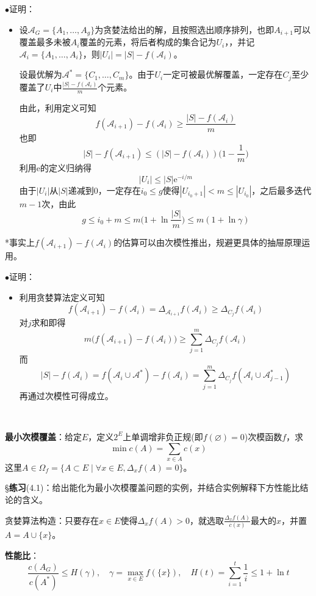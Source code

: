 \documentclass[a4paper,UTF8,fontset=windows]{ctexart}
\newcommand{\exce}[2]{\S\textbf{练习}(#1)：{\kaishu #2}}
\newcommand{\proo}[1]{{\kaishu $\bullet$证明：
\begin{itemize}
    \item[] #1
\end{itemize}
}}
\newcommand{\er}{\mathrm{e}}
\begin{document}
\proo{
    设$\mathcal{A}_G=\{A_1,\dots,A_g\}$为贪婪法给出的解，且按照选出顺序排列，也即$A_{i+1}$可以覆盖最多未被$A_i$覆盖的元素，将后者构成的集合记为$U_i$，，并记$\mathcal{A}_i=\{A_1,\dots,A_i\}$，则$|U_i|=|S|-f(\mathcal{A}_i)$。
    
    设最优解为$\mathcal{A}^*=\{C_1,\dots,C_m\}$。由于$U_i$一定可被最优解覆盖，一定存在$C_j$至少覆盖了$U_i$中$\frac{|S|-f(\mathcal{A}_i)}{m}$个元素。

    由此，利用定义可知
    $$f(\mathcal{A}_{i+1})-f(\mathcal{A}_i)\ge\frac{|S|-f(\mathcal{A}_i)}{m}$$
    也即
    $$|S|-f(\mathcal{A}_{i+1})\le(|S|-f(\mathcal{A}_i))\bigg(1-\frac{1}{m}\bigg)$$
    利用$\er$的定义归纳得
    $$|U_i|\le|S|\er^{-i/m}$$
    由于$|U_i|$从$|S|$递减到0，一定存在$i_0\le g$使得$|U_{i_0+1}|<m\le|U_{i_0}|$，之后最多迭代$m-1$次，由此
    $$g\le i_0+m\le m\bigg(1+\ln\frac{|S|}{m}\bigg)\le m(1+\ln\gamma)$$
}

*事实上$f(\mathcal{A}_{i+1})-f(\mathcal{A}_i)$的估算可以由次模性推出，规避更具体的抽屉原理运用。
\proo{
    利用贪婪算法定义可知
    $$f(\mathcal{A}_{i+1})-f(\mathcal{A}_i)=\Delta_{\mathcal{A}_{i+1}}f(\mathcal{A}_i)\ge\Delta_{C_j}f(\mathcal{A}_i)$$
    对$j$求和即得
    $$m\big(f(\mathcal{A}_{i+1})-f(\mathcal{A}_i)\big)\ge\sum_{j=1}^m\Delta_{C_j}f(\mathcal{A}_i)$$
    而
    $$|S|-f(\mathcal{A}_i)=f(\mathcal{A}_i\cup\mathcal{A}^*)-f(\mathcal{A}_i)=\sum_{j=1}^m\Delta_{C_j}f(\mathcal{A}_i\cup\mathcal{A}^*_{j-1})$$
    再通过次模性可得成立。
}

\

\textbf{最小次模覆盖}：给定$E$，定义$2^E$上单调增非负正规(即$f(\varnothing)=0$)次模函数$f$，求
$$\min c(A)=\sum_{x\in A}c(x)$$
这里$A\in\Omega_f=\{A\subset E\mid\forall x\in E,\Delta_xf(A)=0\}$。

\exce{4.1}{给出能化为最小次模覆盖问题的实例，并结合实例解释下方性能比结论的含义。}

贪婪算法构造：只要存在$x\in E$使得$\Delta_xf(A)>0$，就选取$\frac{\Delta_xf(A)}{c(x)}$最大的$x$，并置$A=A\cup\{x\}$。

\textbf{性能比}：
$$\frac{c(A_G)}{c(A^*)}\le H(\gamma),\quad\gamma=\max_{x\in E}f(\{x\}),\quad H(t)=\sum_{i=1}^t\frac{1}{i}\le1+\ln t$$
\end{document}

